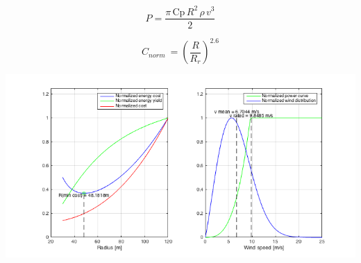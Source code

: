 \begin{equation}
P = \frac{\pi\, \mathrm{Cp}\, R^2\, \rho\, v^3}{2}
\label{eq:P}
\end{equation}

\begin{equation}
C_{norm}\ = {\left(\frac{R}{R_{r}}\right)}^{2.6}
\label{eq:C}
\end{equation}

\includegraphics[width=15cm]{Images/op_radius.png}\\